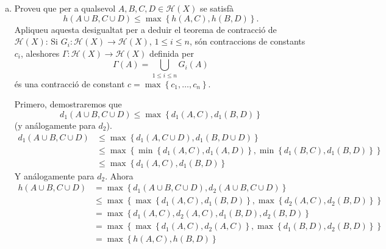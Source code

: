 \documentclass[12pt]{article}
\newcommand{\h}{\mathscr{H}}
\newcommand\setb[1]{\left\{#1\right\}}
\theoremstyle{break}
\begin{document}
{\begin{enumerate}[a)]
	\quad

	Primero, tenemos que asegurar que $f$ está bien definida, lo cual es inmediato por el apartado
	\ref{item:con} que nos asegura que $f$ es continua, y por lo tanto $f(A)$ ($A$ compacto) es compacto.

	Tomamos un punto cualquiera $a \in A$, y sea $b$ tal que
	$d(a, b) = d(a, B)$ (que existe por $B$ compacto), entonces
	\[
		d_1\left( f(a), f(B) \right) \leq \left( f(a), f(b) \right)
		\leq c \cdot d(a, b) = c \cdot d(a, B) \leq c \cdot d_1(A,
		B)
	\]
	Y cómo se cumple para todo $f(a)$, se cumple para el máximo,
	y se tiene
	\[
		d_1\left( f(A), f(B) \right) \leq c \cdot d_1(A, B)
	\]
	Ahora, se tiene
	\[
		\begin{aligned}
			c \cdot h(A, B) &= \max \setb{ c \cdot d_1(A, B), c \cdot d_2(A, B) } \\
			&\leq \max \setb{ d_1\left( f(A), f(B) \right), d_2\left( f(A), f(B) \right) } \\
			&= h\left( f(A), f(B) \right)
		\end{aligned}
	\]
\item Proveu que per a qualsevol $A, B, C, D \in \h(X)$
	se satisfà
	\[
		h\left( A \cup B, C \cup D \right) \leq \max \setb{ h(A,
		C), h(B, D) }.
	\]
	Apliqueu aquesta desigualtat per a deduir el teorema de
	contracció de $\h(X)$: Si $G_i \colon \h(X) \to \h(X)$,
	$1 \leq i \leq n$, són contraccions de constants $c_i$,
	aleshores $\Gamma \colon \h(X) \to \h(X)$ definida per
	\[
		\Gamma(A) = \bigcup_{1 \leq i \leq n} G_i(A)
	\]
	és una contracció de constant
	$c = \max \setb{ c_1, \dots, c_n }$.

	\quad

	Primero, demostraremos que
	\[
		d_1(A \cup B, C \cup D) \leq \max \setb{ d_1(A, C), d_1(B, D) }
	\]
	(y análogamente para $d_2$).
	\[
		\begin{aligned}
			d_1(A \cup B, C \cup D) &\leq \max \setb{ d_1(A, C \cup D), d_1(B, D \cup D) } \\
			&\leq \max \setb{ \min \setb{d_1(A, C), d_1(A, D)}, \min \setb{d_1(B, C), d_1(B, D)}} \\
			&\leq \max \setb{ d_1(A, C), d_1(B, D)}
		\end{aligned}
	\]
	Y análogamente para $d_2$. Ahora
	\[
		\begin{aligned}
			h(A \cup B, C \cup D) &= \max \setb{d_1(A \cup B, C \cup D), d_2(A \cup B, C \cup D)} \\
			&\leq \max \setb{\max \setb{d_1(A, C), d_1(B, D)}, \max \setb{d_2(A, C), d_2(B, D)}} \\
			&= \max \setb{ d_1(A, C), d_2(A, C), d_1(B, D), d_2(B, D)} \\
			&= \max \setb{ \max \setb{d_1(A, C), d_2(A, C)}, \max \setb{d_1(B, D), d_2(B, D)}} \\
			&= \max \setb{ h(A, C), h(B, D) }
		\end{aligned}
	\]


\end{enumerate}}
\end{document}
